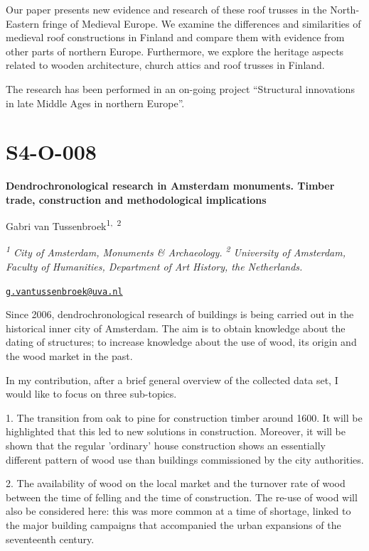 \documentclass[
]{book}
\begin{document}
Our paper presents new evidence and research of these roof trusses in the North-Eastern fringe of Medieval Europe. We examine the differences and similarities of medieval roof constructions in Finland and compare them with evidence from other parts of northern Europe. Furthermore, we explore the heritage aspects related to wooden architecture, church attics and roof trusses in Finland.

The research has been performed in an on-going project ``Structural innovations in late Middle Ages in northern Europe''.

\hypertarget{s4-o-008}{%
\section*{S4-O-008}\label{s4-o-008}}

\textbf{Dendrochronological research in Amsterdam monuments. Timber trade, construction and methodological implications}

Gabri van Tussenbroek\textsuperscript{1,~2}

\emph{\textsuperscript{1} City of Amsterdam, Monuments \& Archaeology. \textsuperscript{2} University of Amsterdam, Faculty of Humanities, Department of Art History, the Netherlands.}

\href{mailto:g.vantussenbroek@uva.nl}{\nolinkurl{g.vantussenbroek@uva.nl}}

Since 2006, dendrochronological research of buildings is being carried out in the historical inner city of Amsterdam. The aim is to obtain knowledge about the dating of structures; to increase knowledge about the use of wood, its origin and the wood market in the past.

In my contribution, after a brief general overview of the collected data set, I would like to focus on three sub-topics.

1. The transition from oak to pine for construction timber around 1600. It will be highlighted that this led to new solutions in construction. Moreover, it will be shown that the regular 'ordinary' house construction shows an essentially different pattern of wood use than buildings commissioned by the city authorities.

2. The availability of wood on the local market and the turnover rate of wood between the time of felling and the time of construction. The re-use of wood will also be considered here: this was more common at a time of shortage, linked to the major building campaigns that accompanied the urban expansions of the seventeenth century.
\end{document}

